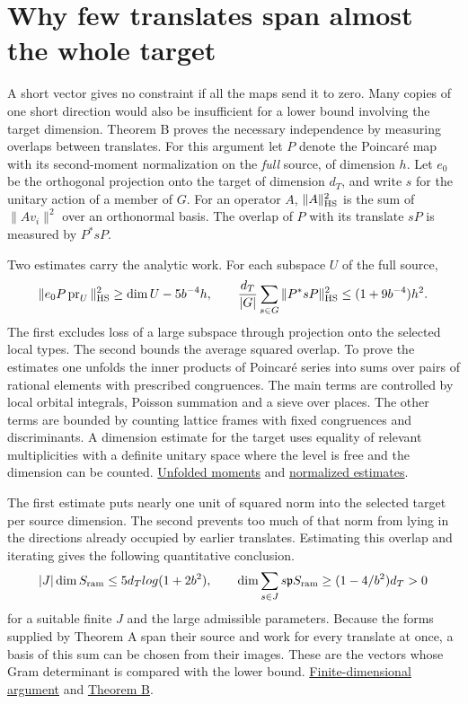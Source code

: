 \documentclass[11pt,letterpaper]{article}
\newcommand{\sref}[2]{\href{https://github.com/VladimirReshetnikov/ProveIt/blob/d8415e76ad850651f8c0083afe689dd9f4a45a10/Analysis/GeneralizedRiemannHypothesis/vendor/grh-lean/grh/src/#1.lean}{#2}}
\newcommand{\upperref}[2]{\sref{#1}{#2}}
\begin{document}
\section{Why few translates span almost the whole target}\label{sec:span}

A short vector gives no constraint if all the maps send it to zero. Many copies of one short direction would also be insufficient for a lower bound involving the target dimension. Theorem B proves the necessary independence by measuring overlaps between translates. For this argument let $P$ denote the Poincar\'e map with its second-moment normalization on the \emph{full} source, of dimension $h$. Let $e_0$ be the orthogonal projection onto the target of dimension $d_T$, and write $s$ for the unitary action of a member of $G$. For an operator $A$, $\|A\|_{\rm HS}^2$ is the sum of $\|A v_i\|^2$ over an orthonormal basis. The overlap of $P$ with its translate $sP$ is measured by $P^*sP$.

Two estimates carry the analytic work. For each subspace $U$ of the full source,
\[
 \|e_0P\operatorname{pr}_U\|_{\rm HS}^2
           \geq \dim U-5b^{-4}h,
 \qquad
 \frac{d_T}{|G|}\sum_{s\in G}\|P^*sP\|_{\rm HS}^2
           \leq (1+9b^{-4})h^2 .
\]
The first excludes loss of a large subspace through projection onto the selected local types. The second bounds the average squared overlap. To prove the estimates one unfolds the inner products of Poincar\'e series into sums over pairs of rational elements with prescribed congruences. The main terms are controlled by local orbital integrals, Poisson summation and a sieve over places. The other terms are bounded by counting lattice frames with fixed congruences and discriminants. A dimension estimate for the target uses equality of relevant multiplicities with a definite unitary space where the level is free and the dimension can be counted. \upperref{New/Spanning/Unfolding/Moments}{Unfolded moments} and \upperref{New/Spanning/SecondMoment/SpanningTheorem}{normalized estimates}.

The first estimate puts nearly one unit of squared norm into the selected target per source dimension. The second prevents too much of that norm from lying in the directions already occupied by earlier translates. Estimating this overlap and iterating gives the following quantitative conclusion. 
\[
 |J|\dim S_{\rm ram}\leq 5d_T\log(1+2b^2),\qquad
 \dim\sum_{s\in J}s\mathfrak p S_{\rm ram}
           \geq(1-4/b^2)d_T>0
\]
for a suitable finite $J$ and the large admissible parameters. Because the forms supplied by Theorem A span their source and work for every translate at once, a basis of this sum can be chosen from their images. These are the vectors whose Gram determinant is compared with the lower bound. \upperref{New/Spanning/SecondMoment/FewTranslates}{Finite-dimensional argument} and \upperref{New/Reduction/ShortAndEnough}{Theorem B}.
\end{document}
